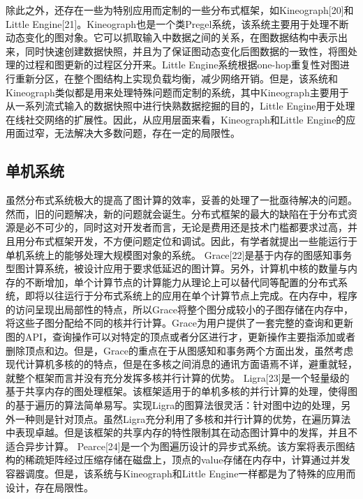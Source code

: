 除此之外，还存在一些为特别应用而定制的一些分布式框架，如Kineograph[20]和Little Engine[21]。Kineograph也是一个类Pregel系统，该系统主要用于处理不断动态变化的图对象。它可以抓取输入中数据之间的关系，在图数据结构中表示出来，同时快速创建数据快照，并且为了保证图动态变化后图数据的一致性，将图处理的过程和图更新的过程区分开来。Little Engine系统根据one-hop重复性对图进行重新分区，在整个图结构上实现负载均衡，减少网络开销。但是，该系统和Kineograph类似都是用来处理特殊问题而定制的系统，其中Kineograph主要用于从一系列流式输入的数据快照中进行快熟数据挖掘的目的，Little Engine用于处理在线社交网络的扩展性。因此，从应用层面来看，Kineograph和Little Engine的应用面过窄，无法解决大多数问题，存在一定的局限性。
\subsection{单机系统}
虽然分布式系统极大的提高了图计算的效率，妥善的处理了一批亟待解决的问题。然而，旧的问题解决，新的问题就会诞生。分布式框架的最大的缺陷在于分布式资源是必不可少的，同时这对开发者而言，无论是费用还是技术门槛都要求过高，并且用分布式框架开发，不方便问题定位和调试。因此，有学者就提出一些能运行于单机系统上的能够处理大规模图对象的系统。
Grace[22]是基于内存的图感知事务型图计算系统，被设计应用于要求低延迟的图计算。另外，计算机中核的数量与内存的不断增加，单个计算节点的计算能力从理论上可以替代同等配置的分布式系统，即将以往运行于分布式系统上的应用在单个计算节点上完成。在内存中，程序的访问呈现出局部性的特点，所以Grace将整个图分成较小的子图存储在内存中，将这些子图分配给不同的核并行计算。Grace为用户提供了一套完整的查询和更新图的API，查询操作可以对特定的顶点或者分区进行才，更新操作主要指添加或者删除顶点和边。但是，Grace的重点在于从图感知和事务两个方面出发，虽然考虑现代计算机多核的的特点，但是在多核之间消息的通讯方面语焉不详，避重就轻，就整个框架而言并没有充分发挥多核并行计算的优势。
Ligra[23]是一个轻量级的基于共享内存的图处理框架。该框架适用于的单机多核的并行计算的处理，使得图的基于遍历的算法简单易写。实现Ligra的图算法很灵活：针对图中边的处理，另外一种则是针对顶点。虽然Ligra充分利用了多核和并行计算的优势，在遍历算法中表现卓越。但是该框架的共享内存的特性限制其在动态图计算中的发挥，并且不适合异步计算。
Pearce[24]是一个为图遍历设计的异步式系统。该方案将表示图结构的稀疏矩阵经过压缩存储在磁盘上，顶点的value存储在内存中，计算通过并发容器调度。但是，该系统与Kineograph和Little Engine一样都是为了特殊的应用而设计，存在局限性。
